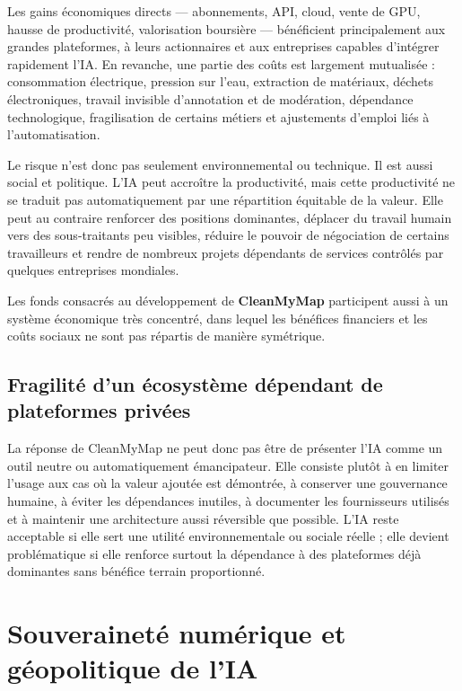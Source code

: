 \documentclass[
  10pt,
  a4paper,
  DIV=11,
  numbers=noendperiod,
  oneside]{scrreprt}
\let\oldtextbf\textbf
\renewcommand{\textbf}[1]{\oldtextbf{\textcolor{cmmnavy}{#1}}}
\begin{document}
Les gains économiques directs --- abonnements, API, cloud, vente de GPU,
hausse de productivité, valorisation boursière --- bénéficient
principalement aux grandes plateformes, à leurs actionnaires et aux
entreprises capables d'intégrer rapidement l'IA. En revanche, une partie
des coûts est largement mutualisée : consommation électrique, pression
sur l'eau, extraction de matériaux, déchets électroniques, travail
invisible d'annotation et de modération, dépendance technologique,
fragilisation de certains métiers et ajustements d'emploi liés à
l'automatisation.

Le risque n'est donc pas seulement environnemental ou technique. Il est
aussi social et politique. L'IA peut accroître la productivité, mais
cette productivité ne se traduit pas automatiquement par une répartition
équitable de la valeur. Elle peut au contraire renforcer des positions
dominantes, déplacer du travail humain vers des sous-traitants peu
visibles, réduire le pouvoir de négociation de certains travailleurs et
rendre de nombreux projets dépendants de services contrôlés par quelques
entreprises mondiales.

Les fonds consacrés au développement de \textbf{CleanMyMap} participent
aussi à un système économique très concentré, dans lequel les bénéfices
financiers et les coûts sociaux ne sont pas répartis de manière
symétrique.

\subsection{Fragilité d'un écosystème dépendant de plateformes
privées}\label{fragilituxe9-dun-uxe9cosystuxe8me-duxe9pendant-de-plateformes-privuxe9es}

La réponse de CleanMyMap ne peut donc pas être de présenter l'IA comme
un outil neutre ou automatiquement émancipateur. Elle consiste plutôt à
en limiter l'usage aux cas où la valeur ajoutée est démontrée, à
conserver une gouvernance humaine, à éviter les dépendances inutiles, à
documenter les fournisseurs utilisés et à maintenir une architecture
aussi réversible que possible. L'IA reste acceptable si elle sert une
utilité environnementale ou sociale réelle ; elle devient problématique
si elle renforce surtout la dépendance à des plateformes déjà dominantes
sans bénéfice terrain proportionné.

\section{Souveraineté numérique et géopolitique de
l'IA}\label{souverainetuxe9-numuxe9rique-et-guxe9opolitique-de-lia}
\end{document}
